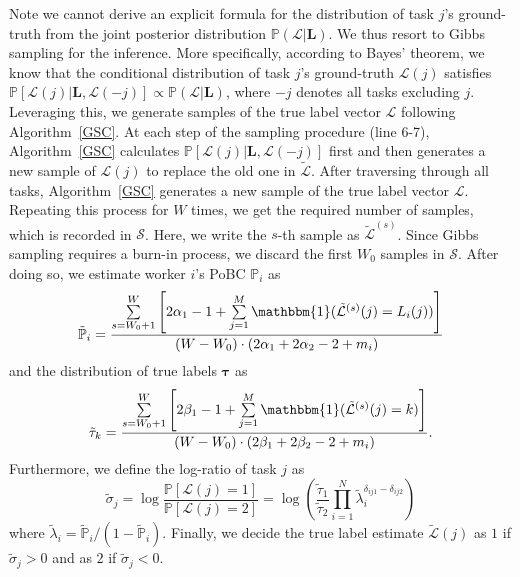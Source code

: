 Note we cannot derive an explicit formula for the distribution of task $j$'s ground-truth from the joint posterior distribution $\mathbb{P}(\mathcal{L}|\bm{L})$. We thus resort to Gibbs sampling for the inference.
More specifically, according to Bayes' theorem, we know that the conditional distribution of task $j$'s ground-truth $\mathcal{L}(j)$ satisfies
$\mathbb{P}[\mathcal{L}(j)|\bm{L}, \mathcal{L}(-j)]\propto \mathbb{P}(\mathcal{L}|\bm{L})$, where $-j$ denotes all tasks excluding $j$.
Leveraging this, we generate samples of the true label vector $\mathcal{L}$ following Algorithm~\ref{GSC}.
At each step of the sampling procedure (line 6-7), Algorithm~\ref{GSC} calculates $\mathbb{P}[\mathcal{L}(j)|\bm{L}, \mathcal{L}(-j)]$ first and then generates a new sample of $\mathcal{L}(j)$ to replace the old one in $\tilde{\mathcal{L}}$.
After traversing through all tasks, Algorithm~\ref{GSC} generates a new sample of the true label vector $\mathcal{L}$.
Repeating this process for $W$ times, we get the required number of samples, which is recorded in $\mathcal{S}$.
Here, we write the $s$-th sample as $\tilde{\mathcal{L}}^{(s)}$.
Since Gibbs sampling requires a burn-in process, we discard the first $W_0$ samples in $\mathcal{S}$. After doing so, we estimate worker $i$'s PoBC $\mathbb{P}_i$ as
\begin{equation}
\label{equation:p_infer}
\tilde{\mathbb{P}}_{i}=\frac{\sum\limits_{s=W_0+1}^{W}\left[2\alpha_{1}-1+\sum\limits_{j=1}^{M}\mathbbm{1}(\tilde{\mathcal{L}}^{(s)}(j)=L_{i}(j))\right]}{(W-W_0)\cdot(2\alpha_{1}+2\alpha_{2}-2+m_i)}
\end{equation}
and the distribution of true labels $\bm{\tau}$ as
\begin{equation}
\label{tau_infer}
\tilde{\tau}_{k}=\frac{\sum\limits_{s=W_0+1}^{W}\left[2\beta_{1}-1+\sum\limits_{j=1}^{M}\mathbbm{1}(\tilde{\mathcal{L}}^{(s)}(j)=k)\right]}{(W-W_0)\cdot(2\beta_{1}+2\beta_{2}-2+m_i)}.
\end{equation}
Furthermore, we define the log-ratio of task $j$ as
\begin{equation}
\label{ProbRatio}
\tilde{\sigma}_j=\log\frac{\mathbb{P}[\mathcal{L}(j)=1]}{\mathbb{P}[\mathcal{L}(j)=2]}=\log\left(\frac{\tilde{\tau}_1}{\tilde{\tau}_2}\prod_{i=1}^{N}\tilde{\lambda}_i^{\delta_{ij1}-\delta_{ij2}}\right)
\end{equation}
where $\tilde{\lambda}_i = \tilde{\mathbb{P}}_i/(1-\tilde{\mathbb{P}}_i)$.
Finally, we decide the true label estimate $\tilde{\mathcal{L}}(j)$ as $1$ if $\tilde{\sigma}_j>0$ and as $2$ if $\tilde{\sigma}_j<0$.
